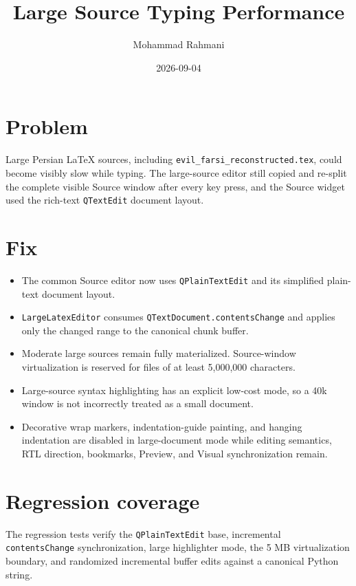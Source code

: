 \documentclass[a4paper]{article}
\title{Large Source Typing Performance}
\date{2026-09-04}
\author{Mohammad Rahmani}
\begin{document}
   \maketitle

   \section{Problem}
   Large Persian LaTeX sources, including \texttt{evil\_farsi\_reconstructed.tex},
   could become visibly slow while typing. The large-source editor still copied
   and re-split the complete visible Source window after every key press, and the
   Source widget used the rich-text \texttt{QTextEdit} document layout.

   \section{Fix}
   \begin{itemize}
      \item The common Source editor now uses \texttt{QPlainTextEdit} and its
      simplified plain-text document layout.
      \item \texttt{LargeLatexEditor} consumes
      \texttt{QTextDocument.contentsChange} and applies only the changed range
      to the canonical chunk buffer.
      \item Moderate large sources remain fully materialized. Source-window
      virtualization is reserved for files of at least 5,000,000 characters.
      \item Large-source syntax highlighting has an explicit low-cost mode, so
      a 40k window is not incorrectly treated as a small document.
      \item Decorative wrap markers, indentation-guide painting, and hanging
      indentation are disabled in large-document mode while editing semantics,
      RTL direction, bookmarks, Preview, and Visual synchronization remain.
   \end{itemize}

   \section{Regression coverage}
   The regression tests verify the \texttt{QPlainTextEdit} base, incremental
   \texttt{contentsChange} synchronization, large highlighter mode, the 5 MB
   virtualization boundary, and randomized incremental buffer edits against a
   canonical Python string.

   
   
\end{document}
